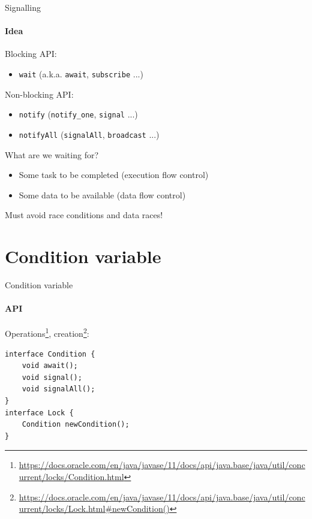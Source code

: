\begin{frame}{Signalling}
\framesubtitle{Idea}

Blocking API:
\begin{itemize}
    \item \texttt{wait} (a.k.a. \texttt{await}, \texttt{subscribe} ...)
\end{itemize}

Non-blocking API:
\begin{itemize}
    \item \texttt{notify} (\texttt{notify\_one}, \texttt{signal} ...)
    \item \texttt{notifyAll} (\texttt{signalAll}, \texttt{broadcast} ...)
\end{itemize}

\pause
What are we waiting for?

\begin{itemize}
 \item Some task to be completed (execution flow control)
 \item Some data to be available (data flow control)
\end{itemize}

Must avoid race conditions and data races!
\end{frame}


\section{Condition variable}

\showTOC

% 
% 


\begin{frame}[fragile]{Condition variable}
\framesubtitle{API}

Operations\footnote{\tiny\url{https://docs.oracle.com/en/java/javase/11/docs/api/java.base/java/util/concurrent/locks/Condition.html}}, creation\footnote{\tiny\url{https://docs.oracle.com/en/java/javase/11/docs/api/java.base/java/util/concurrent/locks/Lock.html#newCondition()}}:
\begin{verbatim}
interface Condition {
    void await();
    void signal();
    void signalAll();
}
interface Lock {
    Condition newCondition();
}
\end{verbatim}
\end{frame}


